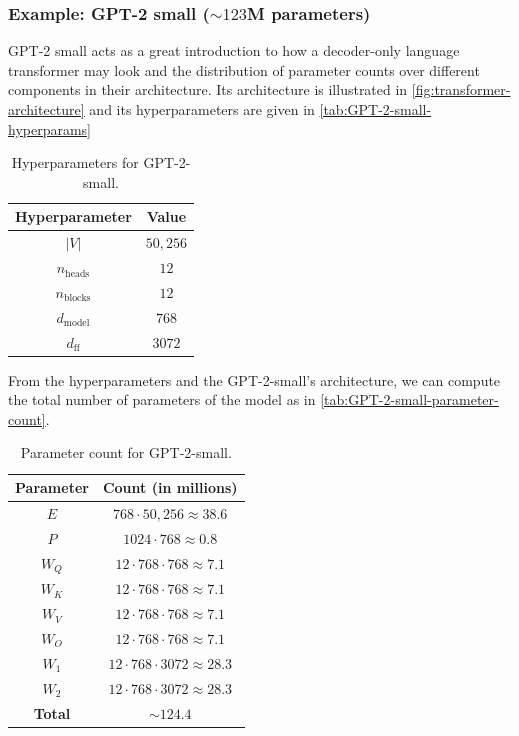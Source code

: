 \documentclass[11pt]{article}
\begin{document}
\subsubsection{Example: GPT-2 small ($\sim123$M parameters)}
GPT-2 small acts as a great introduction to how a decoder-only language transformer may look and the distribution of parameter counts over different components in their architecture. Its architecture is illustrated in \autoref{fig:transformer-architecture} and its hyperparameters are given in \autoref{tab:GPT-2-small-hyperparams}
\begin{table}[ht]
    \centering
    \begin{tabular}{c|c}
        \textbf{Hyperparameter} & \textbf{Value}\\
        \hline
        \hline
        $|V|$ & $50{,}256$\\
        \hline
        $n_{\text{heads}}$ & $12$\\
        \hline
        $n_{\text{blocks}}$ & $12$\\
        \hline
        $d_{\text{model}}$ & $768$ \\
        \hline
        $d_{\text{ff}}$ & $3072$
    \end{tabular}
    \caption{Hyperparameters for GPT-2-small.}
    \label{tab:GPT-2-small-hyperparams}
\end{table}
From the hyperparameters and the GPT-2-small's architecture, we can compute the total number of parameters of the model as in \autoref{tab:GPT-2-small-parameter-count}.
\begin{table}[ht]
    \centering
    \begin{tabular}{c|c}
        \textbf{Parameter} & \textbf{Count (in millions)}\\
        \hline\hline
        $E$ & $768\cdot50{,}256\approx38.6$\\
        \hline
        $P$ & $1024\cdot768\approx0.8$\\
        \hline
        $W_Q$ & $12\cdot768\cdot768\approx7.1$\\
        \hline
        $W_K$ & $12\cdot768\cdot768\approx7.1$\\
        \hline
        $W_V$ & $12\cdot768\cdot768\approx7.1$\\
        \hline
        $W_O$ & $12\cdot768\cdot768\approx7.1$\\
        \hline
        $W_1$ & $12\cdot768\cdot3072\approx28.3$\\
        \hline
        $W_2$ & $12\cdot768\cdot3072\approx28.3$\\
        \hline
        \textbf{Total} & $\sim124.4$
    \end{tabular}
    \caption{Parameter count for GPT-2-small.}
    \label{tab:GPT-2-small-parameter-count}
\end{table}
\end{document}
